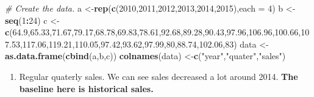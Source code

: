 \documentclass[]{book}
\newenvironment{Shaded}{\begin{snugshade}}{\end{snugshade}}
\newcommand{\KeywordTok}[1]{\textcolor[rgb]{0.13,0.29,0.53}{\textbf{#1}}}
\newcommand{\DataTypeTok}[1]{\textcolor[rgb]{0.13,0.29,0.53}{#1}}
\newcommand{\DecValTok}[1]{\textcolor[rgb]{0.00,0.00,0.81}{#1}}
\newcommand{\FloatTok}[1]{\textcolor[rgb]{0.00,0.00,0.81}{#1}}
\newcommand{\StringTok}[1]{\textcolor[rgb]{0.31,0.60,0.02}{#1}}
\newcommand{\CommentTok}[1]{\textcolor[rgb]{0.56,0.35,0.01}{\textit{#1}}}
\newcommand{\OperatorTok}[1]{\textcolor[rgb]{0.81,0.36,0.00}{\textbf{#1}}}
\newcommand{\NormalTok}[1]{#1}
\providecommand{\tightlist}{%
  \setlength{\itemsep}{0pt}\setlength{\parskip}{0pt}}
\theoremstyle{definition}
\theoremstyle{definition}
\theoremstyle{definition}
\theoremstyle{remark}
\begin{document}
\begin{Shaded}
\begin{Highlighting}[]
\CommentTok{# Create the data.}
\NormalTok{a <-}\KeywordTok{rep}\NormalTok{(}\KeywordTok{c}\NormalTok{(}\DecValTok{2010}\NormalTok{,}\DecValTok{2011}\NormalTok{,}\DecValTok{2012}\NormalTok{,}\DecValTok{2013}\NormalTok{,}\DecValTok{2014}\NormalTok{,}\DecValTok{2015}\NormalTok{),}\DataTypeTok{each =} \DecValTok{4}\NormalTok{)}
\NormalTok{b <-}\StringTok{ }\KeywordTok{seq}\NormalTok{(}\DecValTok{1}\OperatorTok{:}\DecValTok{24}\NormalTok{)}
\NormalTok{c <-}\StringTok{ }\KeywordTok{c}\NormalTok{(}\FloatTok{64.9}\NormalTok{,}\FloatTok{65.33}\NormalTok{,}\FloatTok{71.67}\NormalTok{,}\FloatTok{79.17}\NormalTok{,}\FloatTok{68.78}\NormalTok{,}\FloatTok{69.83}\NormalTok{,}\FloatTok{78.61}\NormalTok{,}\FloatTok{92.68}\NormalTok{,}\FloatTok{89.28}\NormalTok{,}\FloatTok{90.43}\NormalTok{,}\FloatTok{97.96}\NormalTok{,}\FloatTok{106.96}\NormalTok{,}\FloatTok{100.66}\NormalTok{,}\FloatTok{107.53}\NormalTok{,}\FloatTok{117.06}\NormalTok{,}\FloatTok{119.21}\NormalTok{,}\FloatTok{110.05}\NormalTok{,}\FloatTok{97.42}\NormalTok{,}\FloatTok{93.62}\NormalTok{,}\FloatTok{97.99}\NormalTok{,}\DecValTok{80}\NormalTok{,}\FloatTok{88.74}\NormalTok{,}\FloatTok{102.06}\NormalTok{,}\DecValTok{83}\NormalTok{)}
\NormalTok{data <-}\StringTok{ }\KeywordTok{as.data.frame}\NormalTok{(}\KeywordTok{cbind}\NormalTok{(a,b,c))}
\KeywordTok{colnames}\NormalTok{(data) <-}\KeywordTok{c}\NormalTok{(}\StringTok{"year"}\NormalTok{,}\StringTok{"quater"}\NormalTok{,}\StringTok{"sales"}\NormalTok{)}
\end{Highlighting}
\end{Shaded}

\begin{enumerate}
\def\labelenumi{\arabic{enumi}.}
\tightlist
\item
  Regular quaterly sales. We can see sales decreased a lot around 2014.
  \textbf{The baseline here is historical sales.}
\end{enumerate}

\begin{Shaded}
\end{Shaded}
\end{document}
